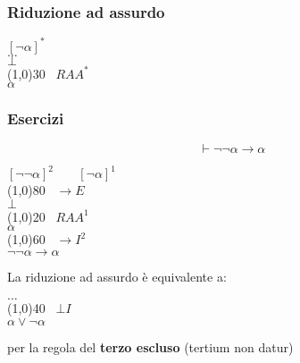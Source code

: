 \documentclass{article}
\theoremstyle{break}
\theoremstyle{break}
\theoremstyle{break}
\theoremstyle{break}
\begin{document}
\subsubsection{Riduzione ad assurdo}
\begin{center}
    \(
    [\neg \alpha]^* 
    \)\\ 
    \( \ldots \) \\
    \( \bot \) \\
        \hspace{1.2cm}\line(1,0){30}\(\;\;\; RAA^* \)\\  
    \(
        \alpha
    \)
\end{center}


\subsubsection{Esercizi}

\begin{example}
    \[
        \vdash \neg \neg \alpha \to \alpha
    \] 
        \begin{center}
            \( [\neg \neg \alpha]^2 \;\;\;\;\;\;\; [\neg \alpha]^1\) \\
     \hspace{1cm}\line(1,0){80}\(\;\;\; \to E\)\\
        \( \bot\) \\
         \hspace{1.2cm}\line(1,0){20}\(\;\;\; RAA^1  \)\\
        \( \alpha\) \\
         \hspace{1cm}\line(1,0){60}\(\;\;\; \to I^2\)\\
        \( \neg \neg \alpha \to \alpha\) \\
    \end{center}
\end{example}
La riduzione ad assurdo è equivalente a:
\begin{center}
          \( \ldots \)\\ 
        \hspace{0.8cm}\line(1,0){40}\(\;\;\; \bot I \)\\  
        \( \alpha \vee \neg \alpha \) 
\end{center} 
per la regola del \textbf{terzo escluso} (tertium non datur)
\end{document}
